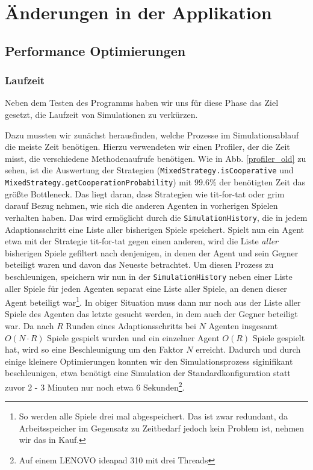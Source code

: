 \documentclass[parskip=full,11pt,openany]{scrreprt}
\begin{document}
\chapter{Änderungen in der Applikation}

\section{Performance Optimierungen}

\subsection{Laufzeit}
Neben dem Testen des Programms haben wir uns für diese Phase das Ziel gesetzt, die Laufzeit von Simulationen zu verkürzen.

Dazu mussten wir zunächst herausfinden, welche Prozesse im Simulationsablauf die meiste Zeit benötigen. Hierzu verwendeten wir einen Profiler, der die Zeit misst, die verschiedene Methodenaufrufe benötigen. Wie in Abb. \ref{profiler_old} zu sehen, ist die Auswertung der Strategien (\texttt{MixedStrategy.isCooperative} und \texttt{MixedStrategy.getCooperationProbability}) mit \(99.6\%\) der benötigten Zeit das größte Bottleneck. Das liegt daran, dass Strategien wie tit-for-tat oder grim darauf Bezug nehmen, wie sich die anderen Agenten in vorherigen Spielen verhalten haben. Das wird ermöglicht durch die \texttt{SimulationHistory}, die in jedem Adaptionsschritt eine Liste aller bisherigen Spiele speichert. Spielt nun ein Agent etwa mit der Strategie tit-for-tat gegen einen anderen, wird die Liste \textit{aller} bisherigen Spiele gefiltert nach denjenigen, in denen der Agent und sein Gegner beteiligt waren und davon das Neueste betrachtet. Um diesen Prozess zu beschleunigen, speichern wir nun in der \texttt{SimulationHistory} neben einer Liste aller Spiele für jeden Agenten separat eine Liste aller Spiele, an denen dieser Agent beteiligt war\footnote{So werden alle Spiele drei mal abgespeichert. Das ist zwar redundant, da Arbeitsspeicher im Gegensatz zu Zeitbedarf jedoch kein Problem ist, nehmen wir das in Kauf.}. In obiger Situation muss dann nur noch aus der Liste aller Spiele des Agenten das letzte gesucht werden, in dem auch der Gegner beteiligt war. Da nach \(R\) Runden eines Adaptionsschritts bei \(N\) Agenten insgesamt \(O(N\cdot R)\) Spiele gespielt wurden und ein einzelner Agent \(O(R)\) Spiele gespielt hat, wird so eine Beschleunigung um den Faktor \(N\) erreicht. Dadurch und durch einige kleinere Optimierungen konnten wir den Simulationsprozess siginifikant beschleunigen, etwa benötigt eine Simulation der Standardkonfiguration statt zuvor \(2\) - \(3\) Minuten nur noch etwa \(6\) Sekunden\footnote{Auf einem LENOVO ideapad 310 mit drei Threads}.
\end{document}
